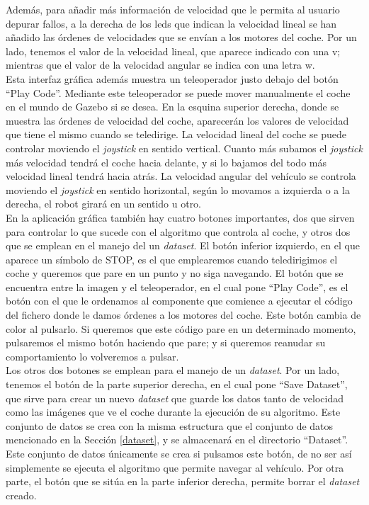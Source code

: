 Además, para añadir más información de velocidad que le permita al usuario depurar fallos, a la derecha de los leds que indican la velocidad lineal se han añadido las órdenes de velocidades que se envían a los motores del coche. Por un lado, tenemos el valor de la velocidad lineal, que aparece indicado con una v; mientras que el valor de la velocidad angular se indica con una letra w.\\

Esta interfaz gráfica además muestra un teleoperador justo debajo del botón ``Play Code''. Mediante este teleoperador se puede mover manualmente el coche en el mundo de Gazebo si se desea. En la esquina superior derecha, donde se muestra las órdenes de velocidad del coche, aparecerán los valores de velocidad que tiene el mismo cuando se teledirige. La velocidad lineal del coche se puede controlar moviendo el \textit{joystick} en sentido vertical. Cuanto más subamos el \textit{joystick} más velocidad tendrá el coche hacia delante, y si lo bajamos del todo más velocidad lineal tendrá hacia atrás. La velocidad angular del vehículo se controla moviendo el \textit{joystick} en sentido horizontal, según lo movamos a izquierda o a la derecha, el robot girará en un sentido u otro.\\

En la aplicación gráfica también hay cuatro botones importantes, dos que sirven para controlar lo que  sucede con el algoritmo que controla al coche, y otros dos que se emplean en el manejo del un \textit{dataset}. El botón inferior  izquierdo, en el que aparece un símbolo de STOP, es el que emplearemos cuando teledirigimos el coche y queremos que pare en un punto y no siga navegando. El botón que se encuentra entre la imagen y el teleoperador, en el cual pone ``Play Code'', es el botón con el que le ordenamos al componente que comience a ejecutar el código del fichero donde le damos órdenes a los motores del coche. Este botón cambia de color al pulsarlo. Si queremos que este código pare en un determinado momento, pulsaremos el mismo botón haciendo que pare; y si queremos reanudar su comportamiento lo volveremos a pulsar.\\

Los otros dos botones se emplean para el manejo de un \textit{dataset}. Por un lado, tenemos el botón de la parte superior derecha, en el cual pone ``Save Dataset'', que sirve para crear un nuevo \textit{dataset} que guarde los datos tanto de velocidad como las imágenes que ve el coche durante la ejecución de su algoritmo. Este conjunto de datos se crea con la misma estructura que el conjunto de datos mencionado en la Sección \ref{dataset}, y se almacenará en el directorio ``Dataset''. Este conjunto de datos únicamente se crea si pulsamos este botón, de no ser así simplemente se ejecuta el algoritmo que permite navegar al vehículo. Por otra parte, el botón que se sitúa en la parte inferior derecha, permite borrar el \textit{dataset} creado.\\



